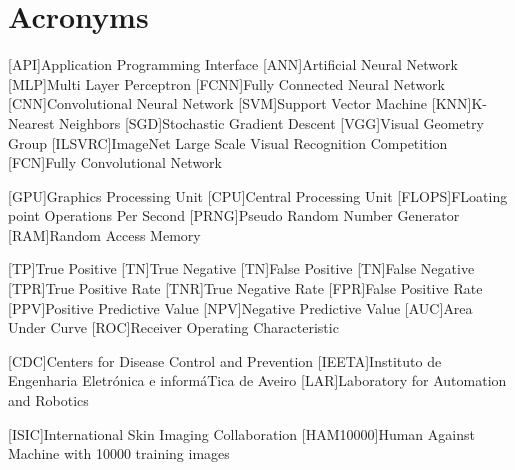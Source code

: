 \chapter{Acronyms}

\footnotesize
\SingleSpacing

\begin{multicols}{2}
\begin{acronym}[AAAAAA]

	[API]{Application Programming Interface}
	[ANN]{Artificial Neural Network}
	[MLP]{Multi Layer Perceptron}
	[FCNN]{Fully Connected Neural Network}
	[CNN]{Convolutional Neural Network}
    [SVM]{Support Vector Machine}
    [KNN]{K-Nearest Neighbors}
	[SGD]{Stochastic Gradient Descent}
	[VGG]{Visual Geometry Group}
    [ILSVRC]{ImageNet Large Scale Visual Recognition Competition}
    [FCN]{Fully Convolutional Network}

    [GPU]{Graphics Processing Unit}
	[CPU]{Central Processing Unit}
    [FLOPS]{FLoating point Operations Per Second}
	[PRNG]{Pseudo Random Number Generator}
	[RAM]{Random Access Memory}

    [TP]{True Positive}
    [TN]{True Negative}
    [TN]{False Positive}
    [TN]{False Negative}
    [TPR]{True Positive Rate}
    [TNR]{True Negative Rate}
    [FPR]{False Positive Rate}
    [PPV]{Positive Predictive Value}
    [NPV]{Negative Predictive Value}
    [AUC]{Area Under Curve}
    [ROC]{Receiver Operating Characteristic}

    [CDC]{Centers for Disease Control and Prevention}
    [IEETA]{Instituto de Engenharia Eletrónica e informáTica de Aveiro}
    [LAR]{Laboratory for Automation and Robotics}

    [ISIC]{International Skin Imaging Collaboration}
    [HAM10000]{Human Against Machine with 10000 training images}

\end{acronym}
\end{multicols}
